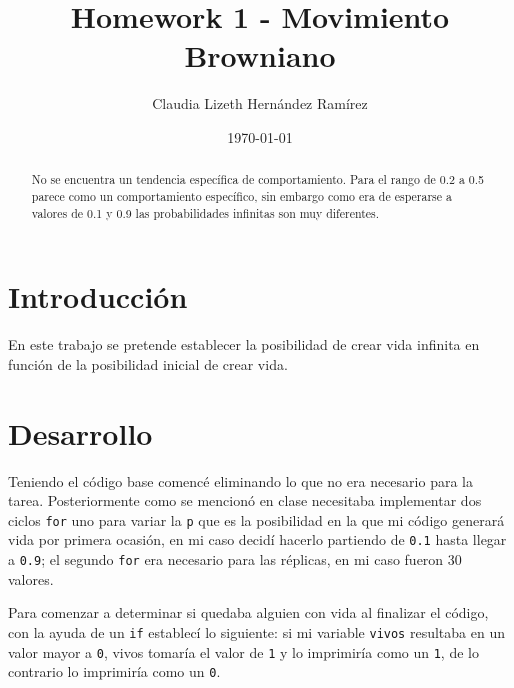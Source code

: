 \documentclass{article}
\author{Claudia Lizeth Hern\'andez Ram\'irez} %
\title{Homework 1 - Movimiento Browniano} %
\date{\today}
\begin{document}

\maketitle %

\begin{abstract} %
  \centering
  No se encuentra un tendencia espec\'ifica de comportamiento.
  Para el rango de 0.2 a 0.5 parece como un comportamiento espec\'ifico, sin embargo como era de esperarse a valores de 0.1 y 0.9 las probabilidades infinitas son muy diferentes.
\end{abstract}


\section{Introducci\'{o}n}\label{intro} %

En este trabajo se pretende establecer la posibilidad de crear vida infinita en funci\'on de la posibilidad inicial de crear vida. 




\section{Desarrollo}\label{desarrollo} %
Teniendo el c\'odigo base \cite{RepoDraElisa}comenc\'e eliminando lo que no era necesario para la tarea. Posteriormente como se mencion\'o en clase necesitaba implementar dos ciclos \texttt{for} uno para variar la \texttt{p} que es la posibilidad en la que mi c\'odigo generar\'a vida por primera ocasi\'on, en mi caso decid\'i hacerlo partiendo de \texttt{0.1} hasta llegar a \texttt{0.9}; el segundo \texttt{for} era necesario para las r\'eplicas, en mi caso fueron 30 valores.

Para comenzar a determinar si quedaba alguien con vida al finalizar el c\'odigo, con la ayuda de un \texttt{if} establec\'i lo siguiente:
si mi variable \texttt{vivos} resultaba en un valor mayor a \texttt{0}, vivos tomar\'ia el valor de \texttt{1} y lo imprimir\'ia como un \texttt{1}, de lo contrario lo imprimir\'ia como un \texttt{0}.
\end{document}
